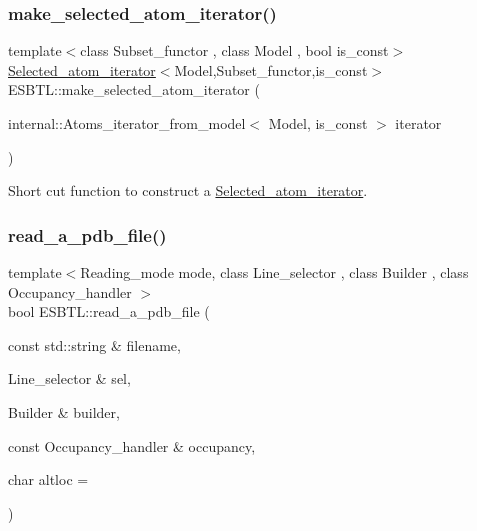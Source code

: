 \subsubsection{\texorpdfstring{make\+\_\+selected\+\_\+atom\+\_\+iterator()}{make\_selected\_atom\_iterator()}\hspace{0.1cm}{\footnotesize\ttfamily [2/2]}}
{\footnotesize\ttfamily template$<$class Subset\+\_\+functor , class Model , bool is\+\_\+const$>$ \\
\hyperlink{classESBTL_1_1Selected__atom__iterator}{Selected\+\_\+atom\+\_\+iterator}$<$Model,Subset\+\_\+functor,is\+\_\+const$>$ E\+S\+B\+T\+L\+::make\+\_\+selected\+\_\+atom\+\_\+iterator (\begin{DoxyParamCaption}\item[{internal\+::\+Atoms\+\_\+iterator\+\_\+from\+\_\+model$<$ Model, is\+\_\+const $>$}]{iterator }\end{DoxyParamCaption})}

Short cut function to construct a \hyperlink{classESBTL_1_1Selected__atom__iterator}{Selected\+\_\+atom\+\_\+iterator}. \mbox{\label{namespaceESBTL_a850d3496f54d82687ff0109404cabd35}} 
\subsubsection{\texorpdfstring{read\+\_\+a\+\_\+pdb\+\_\+file()}{read\_a\_pdb\_file()}\hspace{0.1cm}{\footnotesize\ttfamily [1/2]}}
{\footnotesize\ttfamily template$<$Reading\+\_\+mode mode, class Line\+\_\+selector , class Builder , class Occupancy\+\_\+handler $>$ \\
bool E\+S\+B\+T\+L\+::read\+\_\+a\+\_\+pdb\+\_\+file (\begin{DoxyParamCaption}\item[{const std\+::string \&}]{filename,  }\item[{Line\+\_\+selector \&}]{sel,  }\item[{Builder \&}]{builder,  }\item[{const Occupancy\+\_\+handler \&}]{occupancy,  }\item[{char}]{altloc = {\ttfamily \textquotesingle{}~\textquotesingle{}} }\end{DoxyParamCaption})\hspace{0.3cm}{\ttfamily [inline]}}

